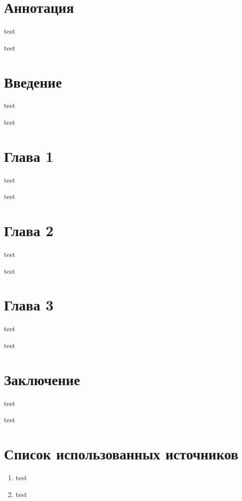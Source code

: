 \documentclass[a4paper,14pt]{article}
\begin{document}
        \tableofcontents
        
        \newpage
        \section*{Аннотация}
        test

test
        
        \newpage
        \section*{Введение}
        test

test

        \newpage
        \section{Глава 1}
        test

test
        
        \newpage
        \section{Глава 2}
        test

test
        
        \newpage
        \section{Глава 3}
        test

test

        \newpage
        \section*{Заключение}
        test

test

        \newpage
        \section*{Список использованных источников}
        \begin{enumerate}
            \item test
\item test
        \end{enumerate}

        
\end{document}
